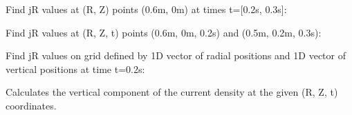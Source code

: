 \documentclass[letterpaper,10pt,english]{sphinxmanual}
\begin{document}
\begin{fulllineitems}
\begin{fulllineitems}
Find jR values at (R, Z) points (0.6m, 0m) at times t={[}0.2s, 0.3s{]}:

\begin{sphinxVerbatim}[commandchars=\\\{\}]
    \PYG{p}{[} \PYG{p}{]}
\end{sphinxVerbatim}

Find jR values at (R, Z, t) points (0.6m, 0m, 0.2s) and
(0.5m, 0.2m, 0.3s):

\begin{sphinxVerbatim}[commandchars=\\\{\}]
  \PYG{p}{[} \PYG{p}{]} \PYG{p}{[} \PYG{p}{]} \PYG{p}{[} \PYG{p}{]} 
\end{sphinxVerbatim}

Find jR values on grid defined by 1D vector of radial positions 
and 1D vector of vertical positions  at time t=0.2s:

\begin{sphinxVerbatim}[commandchars=\\\{\}]
     
\end{sphinxVerbatim}

\end{fulllineitems}


\begin{fulllineitems}
\label{\detokenize{eqtools:eqtools.core.Equilibrium.rz2jZ}}
Calculates the vertical component of the current density at the given (R, Z, t) coordinates.


\end{fulllineitems}
\end{fulllineitems}
\end{document}
